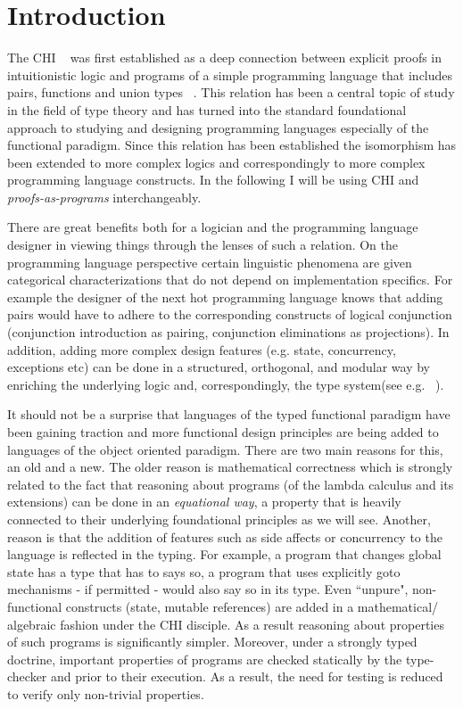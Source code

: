 \chapter{Introduction}\label{intro}
The \ac{CHI}  ~\cite{curry1934functionality,howard1995formulae} was first established as a deep connection between explicit proofs in intuitionistic logic and programs of a simple programming 
language that includes pairs, functions and union types ~\cite{Pierce:2002:TPL:509043,Srensen98lectureson}. This relation has been a central topic of study in the field of type theory and has turned into the standard
foundational approach to studying and designing programming languages especially of the functional paradigm. Since  this relation has been  established the 
isomorphism has been extended to more complex logics and correspondingly to more complex programming language constructs.  
In the following I will be using \acrfull{CHI} and \emph{proofs-as-programs} interchangeably.

There are great benefits both for a logician
and the programming language designer in viewing things through the lenses of such a relation. On the programming language perspective certain linguistic phenomena are given categorical characterizations that do not 
depend on implementation specifics. For example the designer of the next hot programming language  knows that adding pairs would have to adhere to the corresponding constructs of logical conjunction (conjunction introduction as pairing, conjunction eliminations as projections). In addition, adding more complex design features (e.g. state, concurrency, exceptions etc) can be done in a structured, orthogonal, and modular way by enriching the underlying logic  and, correspondingly, the type system(see e.g. ~\cite{Harper:2012:PFP:2431407,CERVESATO20091044,Ong:1997:CFF:263699.263722,DBLP:conf/popl/Griffin90}).

It should not be a surprise that languages of the typed functional paradigm  have been gaining traction and more functional design principles are being added to languages of the object oriented paradigm. There are two main reasons for this, an old and a new. The older reason is mathematical correctness which is strongly related to the fact that reasoning about programs (of the lambda calculus and its extensions) can be done in an \textit{equational way}, a property that is heavily connected to their underlying foundational principles as we will see. Another, reason is that the addition of features such as side affects or concurrency to the language is reflected in the typing. For example,  a program that changes global state has a type that has to  says so, a program that uses explicitly goto mechanisms - if permitted - would also say so in its type. Even ``unpure", non-functional constructs (state, mutable references) are added in a mathematical/ algebraic fashion under the \ac{CHI} disciple. As a result  reasoning about properties of such programs is significantly simpler. Moreover, under a strongly typed doctrine, important properties of programs are checked statically by the type-checker and prior to their execution. As a result, the need for testing is reduced to verify only non-trivial properties. 

